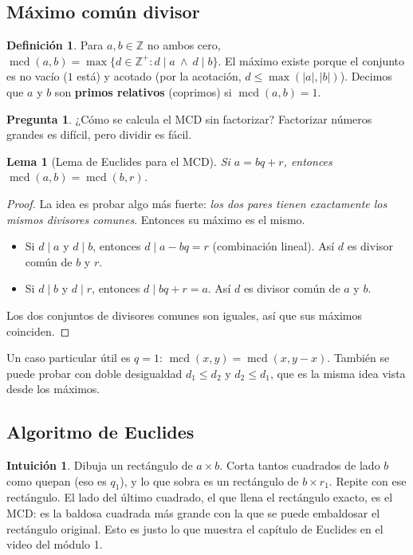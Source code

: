 \documentclass[11pt,a4paper]{article}
\newtheorem{lema}[teorema]{Lema}
\theoremstyle{definition}
\newtheorem{definicion}[teorema]{Definición}
\newcommand{\Z}{\mathbb{Z}}
\newcommand{\mcd}{\operatorname{mcd}}
\theoremstyle{notait}
\newtheorem*{pregunta}{Pregunta}
\theoremstyle{nota}
\newtheorem*{intuicion}{Intuición}
\begin{document}
\subsection{Máximo común divisor}

\begin{definicion}
Para $a,b\in\Z$ no ambos cero, $\mcd(a,b)=\max\{d\in\Z^+ : d\mid a\ \wedge\ d\mid b\}$. El máximo existe porque el conjunto es no vacío ($1$ está) y acotado (por la acotación, $d\le\max(|a|,|b|)$). Decimos que $a$ y $b$ son \textbf{primos relativos} (coprimos) si $\mcd(a,b)=1$.
\end{definicion}

\begin{pregunta}
¿Cómo se calcula el MCD sin factorizar? Factorizar números grandes es difícil, pero dividir es fácil.
\end{pregunta}

\begin{lema}[Lema de Euclides para el MCD]
Si $a=bq+r$, entonces $\mcd(a,b)=\mcd(b,r)$.
\end{lema}

\begin{proof}
La idea es probar algo más fuerte: \emph{los dos pares tienen exactamente los mismos divisores comunes}. Entonces su máximo es el mismo.
\begin{itemize}
\item Si $d\mid a$ y $d\mid b$, entonces $d\mid a-bq=r$ (combinación lineal). Así $d$ es divisor común de $b$ y $r$.
\item Si $d\mid b$ y $d\mid r$, entonces $d\mid bq+r=a$. Así $d$ es divisor común de $a$ y $b$.
\end{itemize}
Los dos conjuntos de divisores comunes son iguales, así que sus máximos coinciden.
\end{proof}

Un caso particular útil es $q=1$: $\mcd(x,y)=\mcd(x,y-x)$. También se puede probar con doble desigualdad $d_1\le d_2$ y $d_2\le d_1$, que es la misma idea vista desde los máximos.

\subsection{Algoritmo de Euclides}

\begin{intuicion}
Dibuja un rectángulo de $a\times b$. Corta tantos cuadrados de lado $b$ como quepan (eso es $q_1$), y lo que sobra es un rectángulo de $b\times r_1$. Repite con ese rectángulo. El lado del último cuadrado, el que llena el rectángulo exacto, es el MCD: es la baldosa cuadrada más grande con la que se puede embaldosar el rectángulo original. Esto es justo lo que muestra el capítulo de Euclides en el video del módulo 1.
\end{intuicion}
\end{document}
